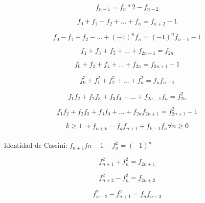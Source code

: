     \begin{equation*}
    	f_{n+1} = f_n * 2 - f_{n-2}
    \end{equation*}
    
    \begin{equation*}
	    f_0 + f_1 + f_2 + \dots + f_n = f_{n+2} -1
    \end{equation*}
    
    \begin{equation*}
    	f_0 - f_1 + f_2 - \dots + (-1)^n f_n = (-1)^n f_{n-1} - 1
    \end{equation*}
    
    \begin{equation*}
    	f_1 + f_3 + f_5 + \dots + f_{2n-1} = f_{2n}
    \end{equation*}
    
    \begin{equation*}
    	f_0 + f_2 + f_4 + \dots + f_{2n} = f_{2n+1} - 1
    \end{equation*}
    
    \begin{equation*}
    	f_0^2 + f_1^2 + f_2^2 + \dots + f_n^2 = f_n f_{n+1}
    \end{equation*}
    
    \begin{equation*}
    	f_1 f_2 + f_2 f_3 + f_3 f_4 + \dots + f_{2n-1} f_n = f_{2n}^2
    \end{equation*}
    
    \begin{equation*}
    	f_1 f_2 + f_2 f_3 + f_3 f_4 + \dots + f_{2n} f_{2n+1} = f_{2n+1}^2 - 1
    \end{equation*}
    
    \begin{equation*}
    	k \ge 1 \Rightarrow f_{n+k} = f_k f_{n+1} + f_{k-1} f_n    \forall n \ge 0
    \end{equation*}\\
	
	Identidad de Cassini: $f_{n+1} f{n-1} - f_n^2 = (-1)^n$
	

	
	\begin{equation*}
		f_{n+1}^2 + f_n^2 = f_{2n + 1}	
	\end{equation*}
	
	\begin{equation*}
		f_{n+2}^2 - f_n^2 = f_{2n + 2}
	\end{equation*}
	
	\begin{equation*}
		f_{n+2}^2 - f_{n+1}^2 = f_n f_{n + 3}
	\end{equation*}
	
